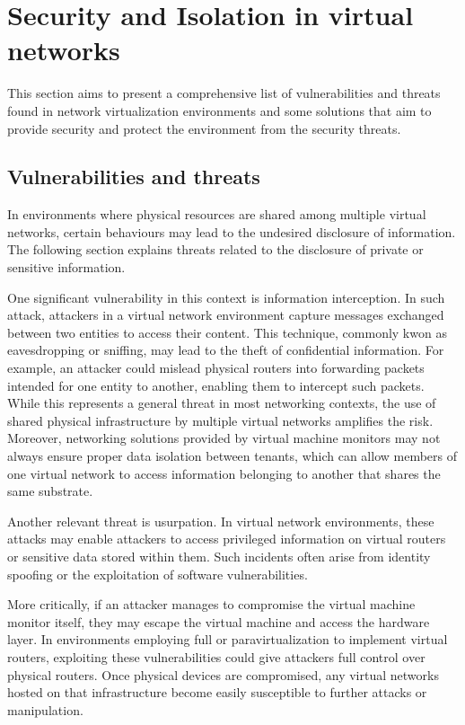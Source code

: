 \section{Security and Isolation in virtual networks}

This section aims to present a comprehensive list of vulnerabilities and threats found in network virtualization environments and some solutions that aim to provide security and protect the environment from the security threats.

\subsection{Vulnerabilities and threats}

In environments where physical resources are shared among multiple virtual networks, certain behaviours may lead to the undesired disclosure of information. The following section explains threats related to the disclosure of private or sensitive information.

One significant vulnerability in this context is information interception. In such attack, attackers in a virtual network environment capture messages exchanged between two entities to access their content. This technique, commonly kwon as eavesdropping or sniffing, may lead to the theft of confidential information. For example, an attacker could mislead physical routers into forwarding packets intended for one entity to another, enabling them to intercept such packets. While this represents a general threat in most networking contexts, the use of shared physical infrastructure by multiple virtual networks amplifies the risk. Moreover, networking solutions provided by virtual machine monitors may not always ensure proper data isolation between tenants, which can allow members of one virtual network to access information belonging to another that shares the same substrate.

Another relevant threat is usurpation. In virtual network environments, these attacks may enable attackers to access privileged information on virtual routers or sensitive data stored within them. Such incidents often arise from identity spoofing or the exploitation of software vulnerabilities.

More critically, if an attacker manages to compromise the virtual machine monitor itself, they may escape the virtual machine and access the hardware layer. In environments employing full or paravirtualization to implement virtual routers, exploiting these vulnerabilities could give attackers full control over physical routers. Once physical devices are compromised, any virtual networks hosted on that infrastructure become easily susceptible to further attacks or manipulation.

